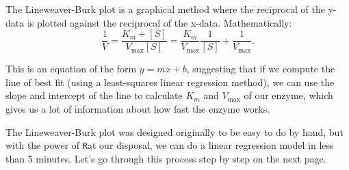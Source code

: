 \documentclass[11pt]{article}
\newcommand{\np}{\vfill\newpage}
\newcommand{\R}{\texttt{R}}
\begin{document}
The Lineweaver-Burk plot is a graphical method where the reciprocal of the y-data is plotted against the reciprocal of the x-data. Mathematically:
\[
\frac{1}{V} = \frac{K_m + [S]}{V_{\mathrm{max}}[S]} = \frac{K_m}{V_{\mathrm{max}}}\frac{1}{[S]} + \frac{1}{V_{\mathrm{max}}}.
\]

This is an equation of the form \(y=mx+b\), suggesting that if we compute the line of best fit (using a least-squares linear regression method), we can use the slope and intercept of the line to calculate \(K_m\) and \(V_{\mathrm{max}}\) of our enzyme, which gives us a lot of information about how fast the enzyme works.

The Lineweaver-Burk plot was designed originally to be easy to do by hand, but with the power of \R at our disposal, we can do a linear regression model in less than 5 minutes. Let's go through this process step by step on the next page.

\np
\end{document}
